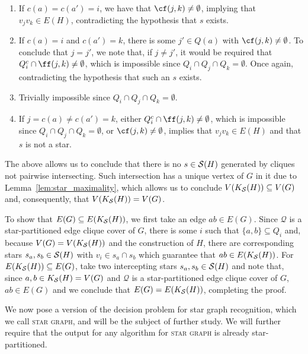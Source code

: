 \begin{tproof}
    \begin{enumerate}
        \item If $c(a) = c(a') = i$, we have that $\cf(j,k)  \neq \emptyset$, implying that $v_jv_k \in E(H)$, contradicting the hypothesis that $s$ exists.
        \item If $c(a) = i$ and $c(a') = k$, there is some $j' \in Q(a)$ with $\cf(j,k) \neq \emptyset$. To conclude that $j = j'$, we note that, if $j \neq j'$, it would be required that $Q_i^c \cap \ff(j,k) \neq \emptyset$, which is impossible since $Q_i \cap Q_j \cap Q_k = \emptyset$.
        Once again, contradicting the hypothesis that such an $s$ exists.
        \item Trivially impossible since $Q_i \cap Q_j \cap Q_k = \emptyset$.
        \item If $j = c(a) \neq c(a') = k$, either $Q_i^c \cap \ff(j,k) \neq \emptyset$, which is impossible since $Q_i \cap Q_j \cap Q_k = \emptyset$, or $\cf(j,k) \neq \emptyset$, implies that $v_jv_k \in E(H)$ and that $s$ is not a star.
    \end{enumerate}
    
    The above allows us to conclude that there is no $s \in \mathcal{S}(H)$ generated by cliques not pairwise intersecting.
    Such intersection has a unique vertex of $G$ in it due to Lemma~\ref{lem:star_maximality}, which allows us to conclude $V(K_{\mathcal{S}}(H)) \subseteq V(G)$ and, consequently, that $V(K_{\mathcal{S}}(H)) = V(G)$.
    
    To show that $E(G) \subseteq E(K_{\mathcal{S}}(H))$, we first take an edge $ab \in E(G)$.
    Since $\mathcal{Q}$ is a star-partitioned edge clique cover of $G$, there is some $i$ such that $\{a,b\} \subseteq Q_i$ and, because $V(G) = V(K_{\mathcal{S}}(H))$ and the construction of $H$, there are corresponding stars $s_a, s_b \in \mathcal{S}(H)$ with $v_i \in s_a \cap s_b$ which guarantee that $ab \in E(K_{\mathcal{S}}(H))$.
    For $E(K_{\mathcal{S}}(H)) \subseteq E(G)$, take two intercepting stars $s_a,s_b \in \mathcal{S}(H)$ and note that, since $a,b \in K_{\mathcal{S}}(H) = V(G)$ and $\mathcal{Q}$ is a star-partitioned edge clique cover of $G$, $ab \in E(G)$ and we conclude that $E(G) = E(K_{\mathcal{S}}(H))$, completing the proof.
\end{tproof}

We now pose a version of the decision problem for star graph recognition, which we call \textsc{star graph}, and will be the subject of further study.
We will further require that the output for any algorithm for \textsc{star graph} is already star-partitioned.


